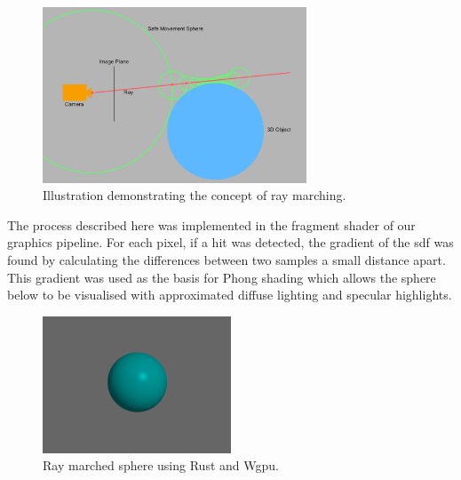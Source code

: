 \documentclass[titlepage]{article}
\begin{document}
\begin{figure}[htp]
    \centering
    \includegraphics[width=0.7\textwidth]{ray_marching.png}
    \caption{Illustration demonstrating the concept of ray marching.}
\end{figure}
\FloatBarrier

The process described here was implemented in the fragment shader of our graphics pipeline. For each pixel, if a hit was detected, the gradient of the \acrshort{sdf} was found by calculating the differences between two samples a small distance apart. This gradient was used as the basis for Phong shading \cite{phong} which allows the sphere below to be visualised with approximated diffuse lighting and specular highlights.

\begin{figure}[htp]
    \centering
    \includegraphics[width=0.5\textwidth]{phong_shading.png}
    \caption{Ray marched sphere using Rust and Wgpu.}
\end{figure}
\FloatBarrier
\end{document}

